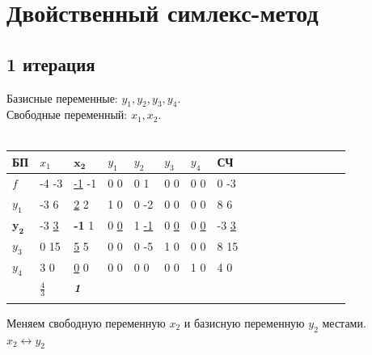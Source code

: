 \documentclass[14pt,a4paper,fleqn]{extarticle}
\begin{document}
	\section*{Двойственный симлекс-метод}
	\subsection*{1 итерация}
	Базисные переменные: $y_1, y_2, y_3, y_4$.\\
	Свободные переменный: $x_1, x_2$.\\\\
	\begin{tabularx}{\textwidth}{V{1}p{1.45cm}V{1}p{1.45cm}V{5}p{1.45cm}V{5}p{1.45cm}V{1}p{1.45cm}V{1}p{1.45cm}V{1}p{1.4cm}V{1}p{1.4cm}V{1}}
		\hline
		БП & $x_1$ & $\boldsymbol{x_2}$ & $y_1$ & $y_2$ & $y_3$ & $y_4$ & СЧ\\
		\hline
		$f$ & -4 \footnotesize -3 & \underline{-1} \footnotesize -1 & 0 \footnotesize 0 & 0 \footnotesize 1 & 0 \footnotesize 0 & 0 \footnotesize 0 & 0 \footnotesize -3\\
		\hline
		$y_1$ & -3 \footnotesize 6 & \underline{2} \footnotesize 2 & 1 \footnotesize 0 & 0 \footnotesize -2 & 0 \footnotesize 0 & 0 \footnotesize 0 & 8 \footnotesize 6\\
		\Xhline{5\arrayrulewidth}
		$\boldsymbol{y_2}$ & -3 \footnotesize \underline{3} & \textbf{-1} \footnotesize 1 & 0 \footnotesize \underline{0} & 1 \footnotesize \underline{-1} & 0 \footnotesize \underline{0} & 0 \footnotesize \underline{0} & -3 \footnotesize \underline{3}\\
		\Xhline{5\arrayrulewidth}
		$y_3$ & 0 \footnotesize 15 & \underline{5} \footnotesize 5 & 0 \footnotesize 0 & 0 \footnotesize -5 & 1 \footnotesize 0 & 0 \footnotesize 0 & 8 \footnotesize 15\\
		\hline
		$y_4$ & 3 \footnotesize 0 & \underline{0} \footnotesize 0 & 0 \footnotesize 0 & 0 \footnotesize 0 & 0 \footnotesize 0 & 1 \footnotesize 0 & 4 \footnotesize 0\\
		\hline
		& \small $\frac{4}{3}$ & \textbf{\textit{1}} & & & & & \\
		\hdashline
	\end{tabularx}
	\newline\newline
	Меняем свободную переменную $x_2$ и базисную переменную $y_2$ местами.\\
	$x_2 \leftrightarrow y_2$
	\newpage
\end{document}

